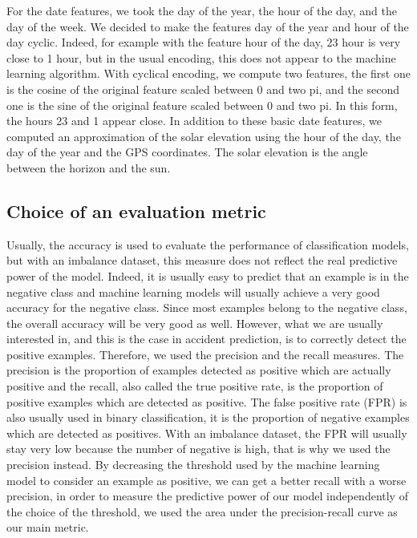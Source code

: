 \documentclass[conference]{IEEEtran}
\begin{document}
For the date features, we took the day of the year, the hour of the day, and the day of the week.
We decided to make the features day of the year and hour of the day cyclic.
Indeed, for example with the feature hour of the day, 23 hour is very close to 1 hour, but in the usual encoding, this does not appear to the machine learning algorithm.
With cyclical encoding, we compute two features, the first one is the cosine of the original feature scaled between 0 and two pi, and the second one is the sine of the original feature scaled between 0 and two pi.
In this form, the hours 23 and 1 appear close.
In addition to these basic date features, we computed an approximation of the solar elevation using the hour of the day, the day of the year and the GPS coordinates. The solar elevation is the angle between the horizon and the sun. 

\subsection{Choice of an evaluation metric}
Usually, the accuracy is used to evaluate the performance of classification models, but with an imbalance dataset, this measure does not reflect the real predictive power of the model.
Indeed, it is usually easy to predict that an example is in the negative class and machine learning models will usually achieve a very good accuracy for the negative class.
Since most examples belong to the negative class, the overall accuracy will be very good as well.
However, what we are usually interested in, and this is the case in accident prediction, is to correctly detect the positive examples.
Therefore, we used the precision and the recall measures.
The precision is the proportion of examples detected as positive which are actually positive and the recall, also called the true positive rate, is the proportion of positive examples which are detected as positive.
The false positive rate (FPR) is also usually used in binary classification, it is the proportion of negative examples which are detected as positives.
With an imbalance dataset, the FPR will usually stay very low because the number of negative is high, that is why we used the precision instead.
By decreasing the threshold used by the machine learning model to consider an example as positive, we can get a better recall with a worse precision, in order to measure the predictive power of our model independently of the choice of the threshold, we used the area under the precision-recall curve as our main metric.
\end{document}
